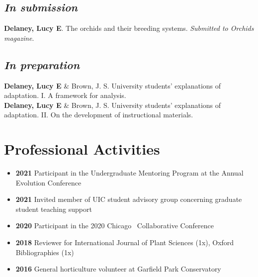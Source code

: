\documentclass[]{article}
\newlength{\cslhangindent}
\newenvironment{cslreferences}
{\setlength{\parindent}{0pt}
\everypar{\setlength{\hangindent}{\cslhangindent}}\ignorespaces}
{\par}
\begin{document}
\subsection{\fontsize{12}{36}\selectfont \textit{In submission}}
\vspace{-2mm}
\begin{cslreferences}

\textbf{Delaney, Lucy E}. The orchids and their breeding systems. \textit{Submitted to Orchids magazine}.
\end{cslreferences}

\vspace{-4mm}
\subsection{\fontsize{12}{36}\selectfont \textit{In preparation}}
\vspace{-2mm}
\begin{cslreferences}
\textbf{Delaney, Lucy E} \& Brown, J. S. University students' explanations of adaptation. I. A framework for analysis.\\

\textbf{Delaney, Lucy E} \& Brown, J. S. University students' explanations of adaptation. II. On the development of instructional materials.
\end{cslreferences}
\vspace{8mm}


\section{\fontsize{16}{48}\selectfont Professional Activities}



\begin{itemize}[label=$\mathwitch*$]
\item{\textbf{2021} Participant in the Undergraduate Mentoring Program at the Annual Evolution Conference}
\item{\textbf{2021} Invited member of UIC student advisory group concerning graduate student teaching support}
\item{\textbf{2020} Participant in the 2020 Chicago \faRProject\ Collaborative Conference \href{https://chircollab.github.io/}{\faLink}}
\item{\textbf{2018} Reviewer for International Journal of Plant Sciences (1x), Oxford Bibliographies (1x)}
\item{\textbf{2016} General horticulture volunteer at Garfield Park Conservatory \href{https://garfieldconservatory.org/}{\faLink}}
\end{itemize}
\end{document}
